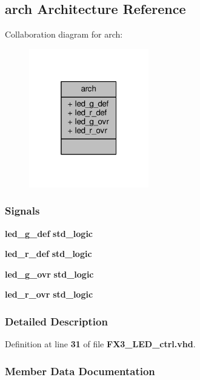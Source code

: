 \subsection{arch Architecture Reference}
\label{classFX3__LED__ctrl_1_1arch}


Collaboration diagram for arch\+:\nopagebreak
\begin{figure}[H]
\begin{center}
\leavevmode
\includegraphics[width=148pt]{d2/d0d/classFX3__LED__ctrl_1_1arch__coll__graph}
\end{center}
\end{figure}
\subsubsection*{Signals}
 \begin{DoxyCompactItemize}
\item 
{\bf led\+\_\+g\+\_\+def} {\bfseries \textcolor{comment}{std\+\_\+logic}\textcolor{vhdlchar}{ }} 
\item 
{\bf led\+\_\+r\+\_\+def} {\bfseries \textcolor{comment}{std\+\_\+logic}\textcolor{vhdlchar}{ }} 
\item 
{\bf led\+\_\+g\+\_\+ovr} {\bfseries \textcolor{comment}{std\+\_\+logic}\textcolor{vhdlchar}{ }} 
\item 
{\bf led\+\_\+r\+\_\+ovr} {\bfseries \textcolor{comment}{std\+\_\+logic}\textcolor{vhdlchar}{ }} 
\end{DoxyCompactItemize}


\subsubsection{Detailed Description}


Definition at line {\bf 31} of file {\bf F\+X3\+\_\+\+L\+E\+D\+\_\+ctrl.\+vhd}.



\subsubsection{Member Data Documentation}
